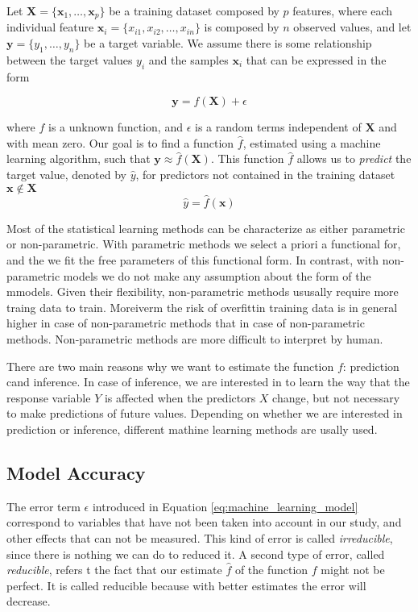Let $\mathbf{X} = \{ \mathbf{x}_1, \ldots, \mathbf{x}_p \}$ be a training dataset composed by $p$ features, where each individual feature $\mathbf{x}_i = \{ x_{i1}, x_{i2}, \ldots, x_{in} \}$ is composed by $n$ observed values, and let $\mathbf{y} = \{ y_1, \ldots, y_n \}$ be a target variable. We assume there is some relationship between the target values $y_i$ and the samples $\mathbf{x}_i$ that can be expressed in the form

\begin{equation}
    \label{eq:machine_learning_model}
    \mathbf{y} = f\left( \mathbf{X} \right) + \epsilon
\end{equation}

where $f$ is a unknown function, and $\epsilon$ is a random terms independent of $\mathbf{X}$ and with mean zero. Our goal is to find a
function $\hat{f}$, estimated using a machine learning algorithm, such that $\mathbf{y} \approx \hat{f} \left( \mathbf{X} \right)$. This  function $\hat{f}$ allows us to \emph{predict} the target value, denoted by $\hat{y}$, for predictors not contained in the training dataset $\mathbf{x} \notin \mathbf{X}$
\[
    \hat{y} = \hat{f} \left( \mathbf{x} \right)
\]

Most of the statistical learning methods can be characterize as either parametric or non-parametric. With parametric methods we select a priori a functional for, and the we fit the free parameters of this functional form. In contrast, with non-parametric models we do not make any assumption about the form of the mmodels. Given their flexibility, non-parametric methods ususally require more traing data to train. Moreiverm the risk of overfittin training data is in general higher in case of non-parametric methods that in case of non-parametric methods. Non-parametric methods are more difficult to interpret by human.

There are two main reasons why we want to estimate the function $f$: prediction cand inference. In case of inference, we are interested in to learn the way that the response variable $Y$ is affected when the predictors $X$ change, but not necessary to make predictions of future values. Depending on whether we are interested in prediction or inference, different mathine learning methods are usally used.

\subsection{Model Accuracy}

The error term $\epsilon$ introduced in Equation \ref{eq:machine_learning_model} correspond to variables that have not been taken into account in our study, and other effects that can not be measured. This kind of error is called \emph{irreducible}, since there is nothing we can do to reduced it. A second type of error, called \emph{reducible}, refers t the fact that our estimate $\hat{f}$ of the function $f$ might not be perfect. It is called reducible because with better estimates the error will decrease.


